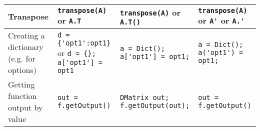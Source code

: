 \documentclass[a4paper,12pt]{book}
\begin{document}
\begin{center}
\begin{tabular}{| p{3.5cm} | p{3.5cm} | p{3.5cm} | p{3.5cm} | }
    Transpose & \verb|transpose(A)| or \verb|A.T| & \verb|transpose(A)| or \verb|A.T()|& \verb|transpose(A)| or \verb|A'| or \verb|A.'| \\ \hline
    Creating a dictionary (e.g. for options) & \verb|d = {'opt1':opt1}| or \verb|d = {}; a['opt1'] = opt1| & \verb|a = Dict();| \verb|a['opt1'] = opt1;| & \verb|a = Dict();| \verb|a('opt1') = opt1;| \\ \hline
    Getting function output by value & \verb|out = f.getOutput()| & \verb|DMatrix out;| \verb|f.getOutput(out);| & \verb|out = f.getOutput()| \\ \hline
  \end{tabular}
\end{center}

%
%
\end{document}
